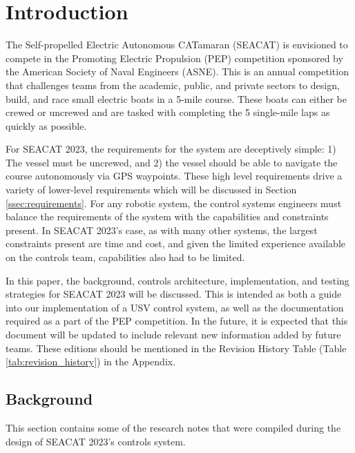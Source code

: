 %

\chapter{Introduction}
\setchapterpreamble[u]{\margintoc}

The Self-propelled Electric Autonomous CATamaran (SEACAT) is envisioned to compete in the Promoting Electric Propulsion (PEP) competition sponsored by the American Society of Naval Engineers (ASNE).
This is an annual competition that challenges teams from the academic, public, and private sectors to design, build, and race small electric boats in a 5-mile course.
These boats can either be crewed or uncrewed and are tasked with completing the 5 single-mile laps as quickly as possible.

For SEACAT 2023, the requirements for the system are deceptively simple: 1) The vessel must be uncrewed, and 2) the vessel should be able to navigate the course autonomously via GPS waypoints.
These high level requirements drive a variety of lower-level requirements which will be discussed in Section \ref{ssec:requirements}.
For any robotic system, the control systems engineers must balance the requirements of the system with the capabilities and constraints present.
In SEACAT 2023's case, as with many other systems, the largest constraints present are time and cost, and given the limited experience available on the controls team, capabilities also had to be limited.

In this paper, the background, controls architecture, implementation, and testing strategies for SEACAT 2023 will be discussed.
This is intended as both a guide into our implementation of a USV control system, as well as the documentation required as a part of the PEP competition.
In the future, it is expected that this document will be updated to include relevant new information added by future teams.
These editions should be mentioned in the Revision History Table (Table \ref{tab:revision_history}) in the Appendix.

\section{Background} 
This section contains some of the research notes that were compiled during the design of SEACAT 2023's controls system.

